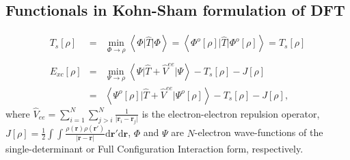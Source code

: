 \documentclass[amsmath,amssymb,preprint,aip,jcp]{revtex4-1}
\begin{document}
{\color{red}
\subsection{Functionals in Kohn-Sham formulation of DFT}
\begin{eqnarray}
T_s[\rho]&=&
\min_{\Phi\longrightarrow \rho}\left<\Phi\vert \hat{T}\vert \Phi\right>
= \left<\Phi^{o}[\rho]\vert \hat{T} \vert \Phi^{o}[\rho]\right>=T_s[\rho]\\
\nonumber\\
E_{xc}[\rho]&=& \label{eq:def_xc}
\min_{\Psi\longrightarrow \rho}\left<\Psi\vert \hat{T}+\hat{V}^{ee}\vert \Psi\right>- T_s[\rho]-J[\rho] \\ &=& \left<\Psi^{o}[\rho]\vert \hat{T}+\hat{V}^{ee} \vert \Psi^{o}[\rho]\right>-T_s[\rho]-J[\rho], \nonumber %
\end{eqnarray}
where 
$\hat{V}_{ee}=\sum_{i=1}^{N}\sum_{j>i}^{N}\frac{1}{\vert\mathbf{r}_i-\mathbf{r}_j\vert}$ 
is the electron-electron repulsion operator,  
$J[\rho]=\frac{1}{2}
\int \int 
\frac
{\rho(\mathbf{r})\rho(\mathbf{r}')}
{
\left|\mathbf{r}-\mathbf{r}\right|}
\mathrm{d}\mathbf{r}'
\mathrm{d}\mathbf{r}
$, $\Phi$ and $\Psi$ are  $N$-electron wave-functions of the single-determinant or Full Configuration Interaction form, respectively.
}
\end{document}
